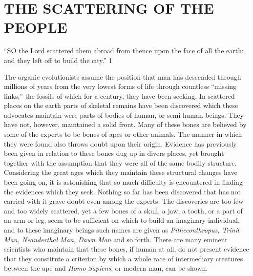 \chapter{THE SCATTERING OF THE PEOPLE}

``SO the Lord scattered them abroad from thence upon the face of all the earth: and they left
off to build the city.'' 1

The organic evolutionists assume the position that man has descended through millions of
years from the very lowest forms of life through countless ``missing links,'' the fossils of
which for a century, they have been seeking. In scattered places on the earth parts of skeletal
remains have been discovered which these advocates maintain were parts of bodies of
human, or semi-human beings. They have not, however, maintained a solid front. Many of
these bones are believed by some of the experts to be bones of apes or other animals. The
manner in which they were found also throws doubt upon their origin. Evidence has
previously been given in relation to these bones dug up in divers places, yet brought together
with the assumption that they were all of the same bodily structure. Considering the great
ages which they maintain these structural changes have been going on, it is astonishing that
so much difficulty is encountered in finding the evidences which they seek. Nothing so far
has been discovered that has not carried with it grave doubt even among the experts. The
discoveries are too few and too widely scattered, yet a few bones of a skull, a jaw, a tooth, or
a part of an arm or leg, seem to be sufficient on which to build an imaginary individual, and
to these imaginary beings such names are given as \textit{Pitheconthropus, Trinil Man, Neanderthal
Man, Dawn Man} and so forth. There are many eminent scientists who maintain that these
bones, if human at all, do not present evidence that they constitute a criterion by which a
whole race of intermediary creatures between the ape and \textit{Homo Sapiens}, or modern man,
can be shown.

